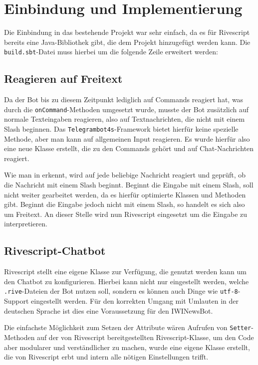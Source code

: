 \section{Einbindung und Implementierung}
Die Einbindung in das bestehende Projekt war sehr einfach, da es für Rivescript bereits eine Java-Bibliothek gibt, die dem Projekt hinzugefügt werden kann. Die \texttt{build.sbt}-Datei muss hierbei um die folgende Zeile erweitert werden:


\subsection{Reagieren auf Freitext}
Da der Bot bis zu diesem Zeitpunkt lediglich auf Commands reagiert hat, was durch die \texttt{onCommand}-Methoden umgesetzt wurde, musste der Bot zusätzlich auf normale Texteingaben reagieren, also auf Textnachrichten, die nicht mit einem Slash beginnen. Das \texttt{Telegrambot4s}-Framework bietet hierfür keine spezielle Methode, aber man kann auf allgemeinen Input reagieren.
Es wurde hierfür also eine neue Klasse erstellt, die zu den Commands gehört und auf Chat-Nachrichten reagiert. 


Wie man in  erkennt, wird auf jede beliebige Nachricht reagiert und geprüft, ob die Nachricht mit einem Slash beginnt. Beginnt die Eingabe mit einem Slash, soll nicht weiter gearbeitet werden, da es hierfür optimierte Klassen und Methoden gibt. Beginnt die Eingabe jedoch nicht mit einem Slash, so handelt es sich also um Freitext. An dieser Stelle wird nun Rivescript eingesetzt um die Eingabe zu interpretieren.

\subsection{Rivescript-Chatbot}
Rivescript stellt eine eigene Klasse zur Verfügung, die genutzt werden kann um den Chatbot zu konfigurieren. Hierbei kann nicht nur eingestellt werden, welche \texttt{.rive}-Dateien der Bot nutzen soll, sondern es können auch Dinge wie \texttt{utf-8}-Support eingestellt werden. Für den korrekten Umgang mit Umlauten in der deutschen Sprache ist dies eine Voraussetzung für den IWINewsBot.

Die einfachste Möglichkeit zum Setzen der Attribute wären Aufrufen von \texttt{Setter}-Methoden auf der von Rivescript bereitgestellten Rivescript-Klasse, um den Code aber modularer und verständlicher  zu machen, wurde eine eigene Klasse erstellt, die von Rivescript erbt und intern alle nötigen Einstellungen trifft. \newpage


